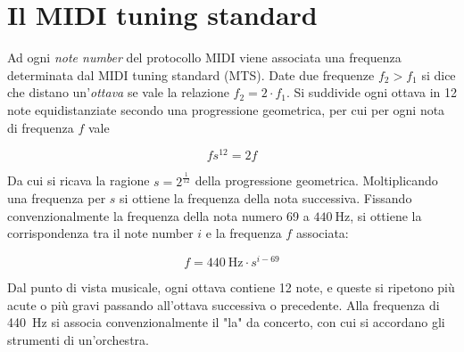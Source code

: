 \section{Il MIDI tuning standard}
Ad ogni \textit{note number} del protocollo MIDI viene associata una frequenza determinata dal MIDI tuning standard (MTS).
Date due frequenze $f_2 > f_1$ si dice che distano un'\textit{ottava} se
vale la relazione $f_2 = 2 \cdot f_1$.
Si suddivide ogni ottava in 12 note equidistanziate secondo una progressione geometrica, per cui per ogni nota di frequenza $f$ vale

\[
fs^{12} = 2f 
\]

Da cui si ricava la ragione $s=2^{\frac{1}{12}}$ della progressione geometrica. Moltiplicando una frequenza per $s$ si ottiene la frequenza della nota successiva.
Fissando convenzionalmente la frequenza della nota numero 69 a $ \SI{440}{\hertz}$, si ottiene la corrispondenza tra
il note number $i$ e la frequenza $f$ associata:

\[
f = \SI{440}{\hertz} \cdot s^{i-69}
\]

Dal punto di vista musicale, ogni ottava contiene 12 note, e queste
si ripetono più acute o più gravi passando all'ottava successiva o precedente.
Alla frequenza di \SI{440}{\hertz} si associa convenzionalmente
il "la" da concerto, con cui si accordano gli strumenti di un'orchestra.


